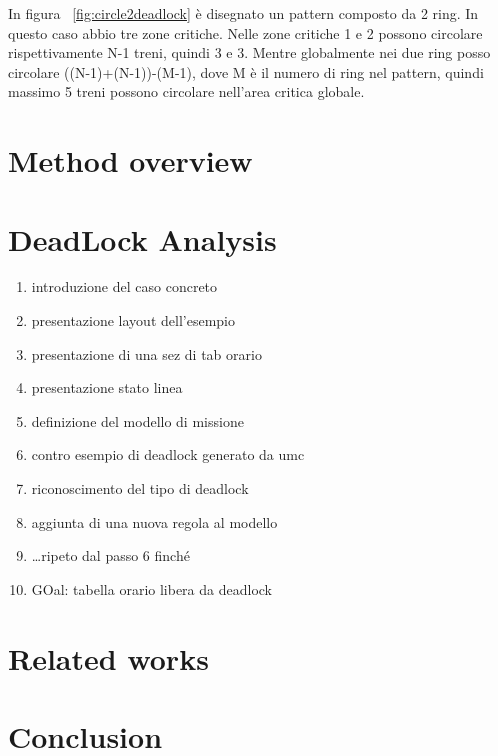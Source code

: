 \documentclass{ewic}
\begin{document}
In figura ~\ref{fig:circle2deadlock}  è disegnato un pattern composto da 2 ring. In questo caso abbio tre zone critiche. Nelle zone critiche 1 e 2 possono circolare rispettivamente N-1 treni, quindi 3 e 3. Mentre globalmente nei due ring posso circolare ((N-1)+(N-1))-(M-1), dove M è il numero di ring nel pattern, quindi massimo 5 treni possono circolare nell'area critica globale.

\section{Method overview}


\section{DeadLock Analysis}
\begin{enumerate}
\item introduzione del caso concreto
\item presentazione layout dell'esempio
\item presentazione di una sez di tab orario
\item presentazione stato linea
\item definizione del modello di missione
\item contro esempio di deadlock generato da umc
\item riconoscimento del tipo di deadlock
\item aggiunta di una nuova regola al modello
\item \ldots ripeto dal passo 6 finch\'{e}
\item GOal: tabella orario libera da deadlock
\end{enumerate}
%

\section{Related works}
%
\section{Conclusion}
%



\pagebreak
\end{document}
